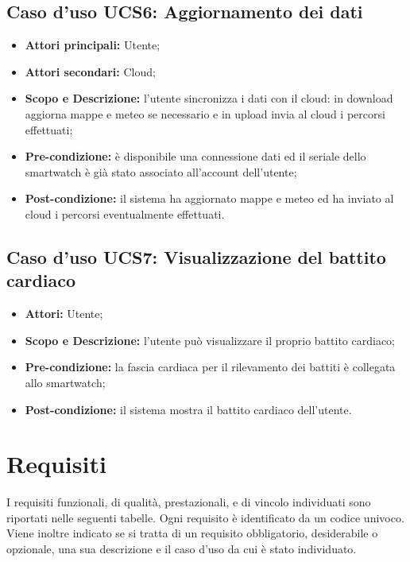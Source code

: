 \subsection{Caso d'uso UCS6: Aggiornamento dei dati}
\begin{itemize}
\item \textbf{Attori principali:} Utente;
\item \textbf{Attori secondari:} Cloud;
\item \textbf{Scopo e Descrizione:} l'utente sincronizza i dati con il cloud: in download aggiorna mappe e meteo se necessario e in upload invia al cloud i percorsi effettuati;
\item \textbf{Pre-condizione:} è disponibile una connessione dati ed il seriale dello smartwatch è già stato associato all'account dell'utente;
\item \textbf{Post-condizione:} il sistema ha aggiornato mappe e meteo ed ha inviato al cloud i percorsi eventualmente effettuati.
\end{itemize}

\subsection{Caso d'uso UCS7: Visualizzazione del battito cardiaco}
\begin{itemize}
\item \textbf{Attori:} Utente;
\item \textbf{Scopo e Descrizione:} l'utente può visualizzare il proprio battito cardiaco;
\item \textbf{Pre-condizione:} la fascia cardiaca per il rilevamento dei battiti è collegata allo smartwatch;
\item \textbf{Post-condizione:} il sistema mostra il battito cardiaco dell'utente.
\end{itemize}

\clearpage
\section{Requisiti}
I requisiti funzionali, di qualità, prestazionali, e di vincolo individuati sono riportati nelle seguenti tabelle.
Ogni requisito è identificato da un codice univoco.
Viene inoltre indicato se si tratta di un requisito obbligatorio, desiderabile o opzionale, una sua descrizione e il caso d'uso da cui è stato individuato. 


